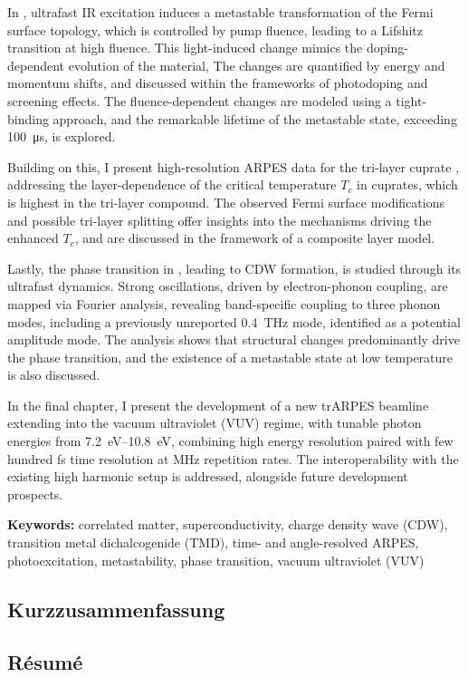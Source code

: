 In , ultrafast IR excitation induces a metastable transformation of the Fermi surface topology, which is controlled by pump fluence, leading to a Lifshitz transition at high fluence.
This light-induced change mimics the doping-dependent evolution of the material,
The changes are quantified by energy and momentum shifts, and discussed within the frameworks of photodoping and screening effects.
The fluence-dependent changes are modeled using a tight-binding approach, and the remarkable lifetime of the metastable state, exceeding \qty{100}{\micro\second}, is explored.

Building on this, I present high-resolution ARPES data for the tri-layer cuprate , addressing the layer-dependence of the critical temperature $T_c$ in cuprates, which is highest in the tri-layer compound.
The observed Fermi surface modifications and possible tri-layer splitting offer insights into the mechanisms driving the enhanced $T_c$, and are discussed in the framework of a composite layer model.

Lastly, the phase transition in , leading to CDW formation, is studied through its ultrafast dynamics.
Strong oscillations, driven by electron-phonon coupling, are mapped via Fourier analysis, revealing band-specific coupling to three phonon modes, including a previously unreported \qty{0.4}{\tera\hertz} mode, identified as a potential amplitude mode.
The analysis shows that structural changes predominantly drive the phase transition, and the existence of a metastable state at low temperature is also discussed.

In the final chapter, I present the development of a new trARPES beamline extending into the vacuum ultraviolet (VUV) regime, with tunable photon energies from \qtyrange{7.2}{10.8}{\electronvolt}, combining high energy resolution paired with few hundred \unit{\femto\second} time resolution at \unit{\mega\hertz} repetition rates.
The interoperability with the existing high harmonic setup is addressed, alongside future development prospects.\hfill\break

\textbf{Keywords:} correlated matter, superconductivity, charge density wave (CDW), transition metal dichalcogenide (TMD), time- and angle-resolved ARPES, photoexcitation, metastability, phase transition, vacuum ultraviolet (VUV)


\begin{otherlanguage}{german}
\cleardoublepage
\chapter*{Kurzzusammenfassung}
\lipsum[1-2]
\end{otherlanguage}




\begin{otherlanguage}{french}
\cleardoublepage
\chapter*{Résumé}
\lipsum[1-2]
\end{otherlanguage}


